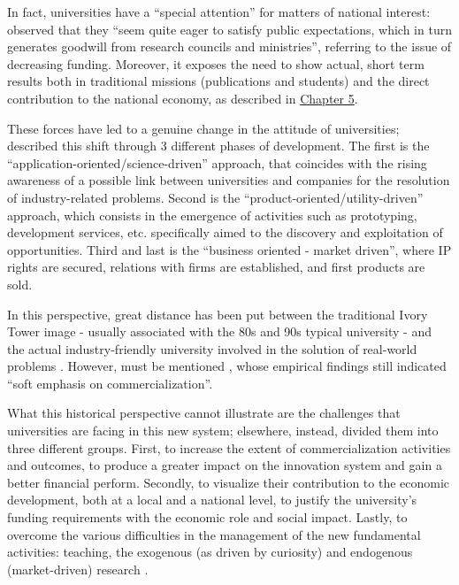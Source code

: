 In fact, universities have a \enquote{special attention} for matters of national interest: \citet{Rasmussen2006} observed that they \enquote{seem quite eager to satisfy public expectations, which in turn generates goodwill from research councils and ministries}, referring to the issue of decreasing funding. Moreover, it exposes the need to show actual, short term results both in traditional missions (publications and students) and the direct contribution to the national economy, as described in \hyperref[Chapter5]{Chapter 5}.

These forces have led to a genuine change in the attitude of universities; \citet{Tijssen2006} described this shift through 3 different phases of development. The first is the \enquote{application-oriented/science-driven} approach, that coincides with the rising awareness of a possible link between universities and companies for the resolution of industry-related problems. Second is the \enquote{product-oriented/utility-driven} approach, which consists in the emergence of activities such as prototyping, development services, etc. specifically aimed to the discovery and exploitation of opportunities. Third and last is the \enquote{business oriented - market driven}, where IP rights are secured, relations with firms are established, and first products are sold.

In this perspective, great distance has been put between the traditional Ivory Tower image - usually associated with the 80s and 90s typical university - and the actual industry-friendly university involved in the solution of real-world problems \citep{Baldini2006}. However, must be mentioned \citet{Rasmussen2006}, whose empirical findings still indicated \enquote{soft emphasis on commercialization}.

What this historical perspective cannot illustrate are the challenges that universities are facing in this new system; elsewhere, instead, \citet{Rasmussen2006} divided them into three different groups. First, to increase the extent of commercialization activities and outcomes, to produce a greater impact on the innovation system and gain a better financial perform. Secondly, to visualize their contribution to the economic development, both at a local and a national level, to justify the university's funding requirements with the economic role and social impact. Lastly, to overcome the various difficulties in the management of the new fundamental activities: teaching, the exogenous (as driven by curiosity) and endogenous (market-driven) research \citep{Debackere2005}. 

